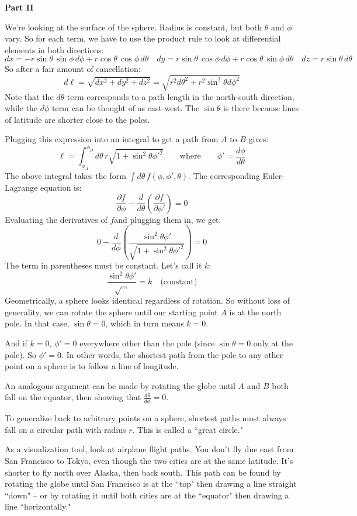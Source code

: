 \documentclass[12pt]{article}
\newcommand{\purple}[1]{{\color{purple} #1}}
\begin{document}
\purple{
\textbf{Part II}

We're looking at the surface of the sphere. Radius is constant, but both $\theta$ and $\phi$ vary. So for each term, we have to use the product rule to look at differential elements in both directions:
$$
dx = -r \sin\theta \, \sin\phi \, d\phi + r \cos\theta \, \cos\phi \, d\theta
\quad
dy = r \sin\theta \, \cos\phi \, d\phi + r \cos\theta \, \sin\phi \, d\theta
\quad
dz = r \sin\theta \, d\theta
$$
So after a fair amount of cancellation:
$$
d\ell = \sqrt{dx^2 + dy^2 + dz^2} = \sqrt{ r^2 d\theta^2 + r^2 \sin^2 \theta d\phi^2}
$$
Note that the $d\theta$ term corresponds to a path length in the north-south direction, while the $d\phi$ term can be thought of as east-west. The $\sin\theta$ is there because lines of latitude are shorter close to the poles. 

Plugging this expression into an integral to get a path from $A$ to $B$ gives:
$$
\ell = \int_{\phi_A}^{\phi_B} d\theta \, r \sqrt{ 1 + \sin^2 \theta \phi'^2 } \quad \quad \mathrm{where} \quad \quad \phi' = \frac{d\phi}{d\theta}
$$
The above integral takes the form $\int d\theta \, f(\phi, \phi', \theta)$. The corresponding Euler-Lagrange equation is:
$$
\frac{\partial f}{\partial \phi} - \frac{d}{d\theta} \left( \frac{\partial f}{\partial \phi'} \right) = 0
$$
Evaluating the derivatives of $f$and plugging them in, we get:
$$
0 - \frac{d}{d\phi} \left( \frac{\sin^2\theta \phi'}{\sqrt{ 1 + \sin^2 \theta \phi'^2 }} \right) = 0
$$
The term in parentheses must be constant. Let's call it $k$:
$$
\frac{\sin^2\theta \phi'}{\sqrt{\cdots}} = k \quad \text{(constant)}
$$
Geometrically, a sphere looks identical regardless of rotation. So without loss of generality, we can rotate the sphere until our starting point $A$ is at the north pole. In that case, $\sin\theta=0$, which in turn means $k=0$.

And if $k=0$, $\phi'=0$ everywhere other than the pole (since $\sin\theta=0$ only at the pole). So $\phi'=0$. In other words, the shortest path from the pole to any other point on a sphere is to follow a line of longitude. 

An analogous argument can be made by rotating the globe until $A$ and $B$ both fall on the equator, then showing that $\frac{d\theta}{d\phi}=0$. 

To generalize back to arbitrary points on a sphere, shortest paths must always fall on a circular path with radius $r$. This is called a ``great circle." 

As a visualization tool, look at airplane flight paths. You don't fly due east from San Francisco to Tokyo, even though the two cities are at the same latitude. It's shorter to fly north over Alaska, then back south. This path can be found by rotating the globe until San Francisco is at the ``top" then drawing a line straight ``down" -- or by rotating it until both cities are at the ``equator" then drawing a line ``horizontally."
}
\end{document}
